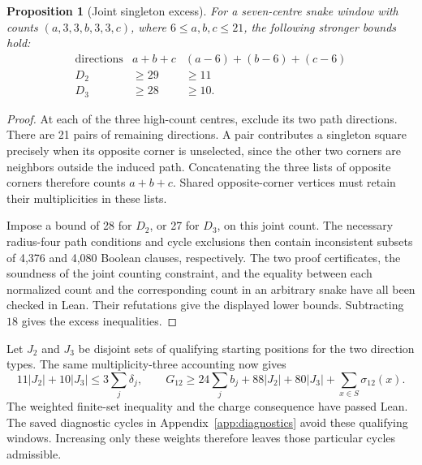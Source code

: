\documentclass[11pt,a4paper]{article}
\newtheorem{proposition}[theorem]{Proposition}
\theoremstyle{definition}
\theoremstyle{remark}
\begin{document}
\begin{proposition}[Joint singleton excess]\label{prop:joint-singleton-excess}
For a seven-centre snake window with counts $(a,3,3,b,3,3,c)$, where $6\le a,b,c\le21$, the following stronger bounds hold:
\[
\begin{array}{c|c|c}
\text{directions}&a+b+c& (a-6)+(b-6)+(c-6)\\\hline
D_2&\ge29&\ge11\\
D_3&\ge28&\ge10.
\end{array}
\]
\end{proposition}
\begin{proof}
At each of the three high-count centres, exclude its two path directions. There are 21 pairs of remaining directions. A pair contributes a singleton square precisely when its opposite corner is unselected, since the other two corners are neighbors outside the induced path. Concatenating the three lists of opposite corners therefore counts $a+b+c$. Shared opposite-corner vertices must retain their multiplicities in these lists.

Impose a bound of 28 for $D_2$, or 27 for $D_3$, on this joint count. The necessary radius-four path conditions and cycle exclusions then contain inconsistent subsets of 4,376 and 4,080 Boolean clauses, respectively. The two proof certificates, the soundness of the joint counting constraint, and the equality between each normalized count and the corresponding count in an arbitrary snake have all been checked in Lean. Their refutations give the displayed lower bounds. Subtracting $18$ gives the excess inequalities.
\end{proof}

Let $J_2$ and $J_3$ be disjoint sets of qualifying starting positions for the two direction types. The same multiplicity-three accounting now gives
\[
11|J_2|+10|J_3|\le3\sum_j\delta_j,
\qquad
G_{12}\ge24\sum_j b_j+88|J_2|+80|J_3|+\sum_{x\in S}\sigma_{12}(x).
\]
The weighted finite-set inequality and the charge consequence have passed Lean. The saved diagnostic cycles in Appendix~\ref{app:diagnostics} avoid these qualifying windows. Increasing only these weights therefore leaves those particular cycles admissible.
\end{document}

